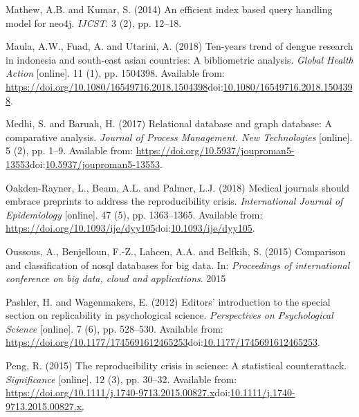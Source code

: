 \documentclass[]{article}
\begin{document}
\leavevmode\hypertarget{ref-Mathew2014}{}%
Mathew, A.B. and Kumar, S. (2014) An efficient index based query
handling model for neo4j. \emph{IJCST}. 3 (2), pp. 12--18.

\leavevmode\hypertarget{ref-Maula2018}{}%
Maula, A.W., Fuad, A. and Utarini, A. (2018) Ten-years trend of dengue
research in indonesia and south-east asian countries: A bibliometric
analysis. \emph{Global Health Action} {[}online{]}. 11 (1), pp. 1504398.
Available from:
\url{https://doi.org/10.1080/16549716.2018.1504398}doi:\href{https://doi.org/10.1080/16549716.2018.1504398}{10.1080/16549716.2018.1504398}.

\leavevmode\hypertarget{ref-Medhi2017}{}%
Medhi, S. and Baruah, H. (2017) Relational database and graph database:
A comparative analysis. \emph{Journal of Process Management. New
Technologies} {[}online{]}. 5 (2), pp. 1--9. Available from:
\url{https://doi.org/10.5937/jouproman5-13553}doi:\href{https://doi.org/10.5937/jouproman5-13553}{10.5937/jouproman5-13553}.

\leavevmode\hypertarget{ref-OakdenRayner2018}{}%
Oakden-Rayner, L., Beam, A.L. and Palmer, L.J. (2018) Medical journals
should embrace preprints to address the reproducibility crisis.
\emph{International Journal of Epidemiology} {[}online{]}. 47 (5), pp.
1363--1365. Available from:
\url{https://doi.org/10.1093/ije/dyy105}doi:\href{https://doi.org/10.1093/ije/dyy105}{10.1093/ije/dyy105}.

\leavevmode\hypertarget{ref-Oussous2015}{}%
Oussous, A., Benjelloun, F.-Z., Lahcen, A.A. and Belfkih, S. (2015)
Comparison and classification of nosql databases for big data. In:
\emph{Proceedings of international conference on big data, cloud and
applications}. 2015

\leavevmode\hypertarget{ref-Pashler2012}{}%
Pashler, H. and Wagenmakers, E. (2012) Editors' introduction to the
special section on replicability in psychological science.
\emph{Perspectives on Psychological Science} {[}online{]}. 7 (6), pp.
528--530. Available from:
\url{https://doi.org/10.1177/1745691612465253}doi:\href{https://doi.org/10.1177/1745691612465253}{10.1177/1745691612465253}.

\leavevmode\hypertarget{ref-Peng2015}{}%
Peng, R. (2015) The reproducibility crisis in science: A statistical
counterattack. \emph{Significance} {[}online{]}. 12 (3), pp. 30--32.
Available from:
\url{https://doi.org/10.1111/j.1740-9713.2015.00827.x}doi:\href{https://doi.org/10.1111/j.1740-9713.2015.00827.x}{10.1111/j.1740-9713.2015.00827.x}.
\end{document}
